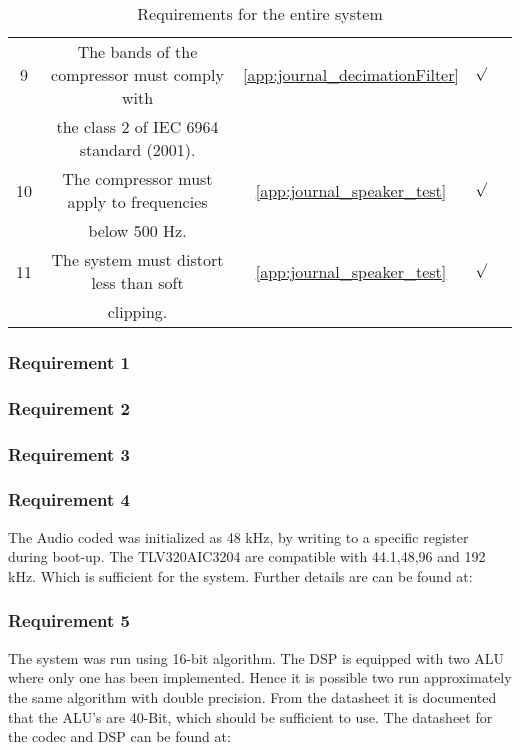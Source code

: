 \begin{table}[H]
\begin{tabular}{|c|c|c|c|c|}
9			& The bands of the compressor must comply with 	& \autoref{app:journal_decimationFilter}&	$\surd$			\\ 
			& the class 2 of IEC 6964 standard (2001).		& 			 					 		&					\\ \hline
%
10			& The compressor must apply to frequencies		& \autoref{app:journal_speaker_test}	&	$\surd$			\\ 
			& below 500 Hz. 							 	&			 							&					\\ \hline
%
11			& The system must distort less than soft  		& \autoref{app:journal_speaker_test}	&	$\surd$			\\ 
			& clipping.										& 			 						 	&					\\ \hline								
\end{tabular}	
\caption{Requirements for the entire system}
\label{table:acceptancetest}
\end{table}

\subsubsection*{Requirement 1}

\subsubsection*{Requirement 2}

\subsubsection*{Requirement 3}

\subsubsection*{Requirement 4}
The Audio coded was initialized as 48 kHz, by writing to a specific register during boot-up. The TLV320AIC3204 are compatible with 44.1,48,96 and 192 kHz. Which is sufficient for the system. Further details are can be found at:


\subsubsection*{Requirement 5}
The system was run using 16-bit algorithm. The DSP is equipped with two ALU where only one has been implemented. Hence it is possible two run approximately the same algorithm with double precision. From the datasheet it is documented that the ALU's are 40-Bit, which should be sufficient to use. The datasheet for the codec and DSP can be found at: \\
\\

